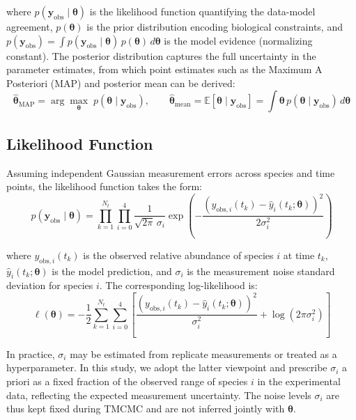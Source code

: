 \documentclass[11pt,a4paper]{article}
\begin{document}
\noindent where $p(\mathbf{y}_{\mathrm{obs}} \mid \boldsymbol{\theta})$ is the likelihood function quantifying the data-model agreement, $p(\boldsymbol{\theta})$ is the prior distribution encoding biological constraints, and $p(\mathbf{y}_{\mathrm{obs}}) = \int p(\mathbf{y}_{\mathrm{obs}} \mid \boldsymbol{\theta})\, p(\boldsymbol{\theta})\, d\boldsymbol{\theta}$ is the model evidence (normalizing constant). The posterior distribution captures the full uncertainty in the parameter estimates, from which point estimates such as the Maximum A Posteriori (MAP) and posterior mean can be derived:
\begin{equation}
\hat{\boldsymbol{\theta}}_{\mathrm{MAP}} = \arg\max_{\boldsymbol{\theta}} \; p(\boldsymbol{\theta} \mid \mathbf{y}_{\mathrm{obs}}), \qquad
\hat{\boldsymbol{\theta}}_{\mathrm{mean}} = \mathbb{E}[\boldsymbol{\theta} \mid \mathbf{y}_{\mathrm{obs}}] = \int \boldsymbol{\theta}\, p(\boldsymbol{\theta} \mid \mathbf{y}_{\mathrm{obs}})\, d\boldsymbol{\theta}
\end{equation}

\subsection{Likelihood Function}

Assuming independent Gaussian measurement errors across species and time points, the likelihood function takes the form:
\begin{equation}
p(\mathbf{y}_{\mathrm{obs}} \mid \boldsymbol{\theta}) = \prod_{k=1}^{N_t} \prod_{i=0}^{4} \frac{1}{\sqrt{2\pi}\,\sigma_i} \exp\!\left( -\frac{\left(y_{\mathrm{obs},i}(t_k) - \hat{y}_i(t_k; \boldsymbol{\theta})\right)^2}{2\sigma_i^2} \right)
\label{eq:likelihood}
\end{equation}

\noindent where $y_{\mathrm{obs},i}(t_k)$ is the observed relative abundance of species $i$ at time $t_k$, $\hat{y}_i(t_k; \boldsymbol{\theta})$ is the model prediction, and $\sigma_i$ is the measurement noise standard deviation for species $i$. The corresponding log-likelihood is:
\begin{equation}
\ell(\boldsymbol{\theta}) = -\frac{1}{2} \sum_{k=1}^{N_t} \sum_{i=0}^{4} \left[ \frac{\left(y_{\mathrm{obs},i}(t_k) - \hat{y}_i(t_k; \boldsymbol{\theta})\right)^2}{\sigma_i^2} + \log(2\pi \sigma_i^2) \right]
\label{eq:loglik}
\end{equation}

\noindent In practice, $\sigma_i$ may be estimated from replicate measurements or treated as a hyperparameter. In this study, we adopt the latter viewpoint and prescribe $\sigma_i$ a priori as a fixed fraction of the observed range of species $i$ in the experimental data, reflecting the expected measurement uncertainty. The noise levels $\sigma_i$ are thus kept fixed during TMCMC and are not inferred jointly with $\boldsymbol{\theta}$.
\end{document}
